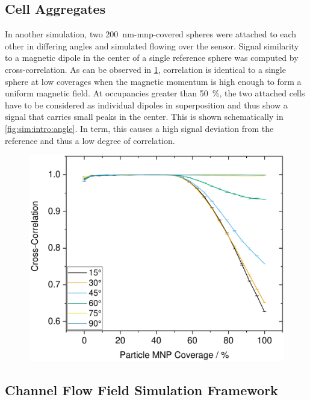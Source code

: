 \subsection{Cell Aggregates}
In another simulation, two \SI{200}{\nano\meter}-\gls{mnp}-covered spheres were attached to each other in differing angles and simulated flowing over the sensor. Signal similarity to a magnetic dipole in the center of a single reference sphere was computed by cross-correlation. As can be observed in \cref{fig:sim:aggregates}, correlation is identical to a single sphere at low coverages when the magnetic momentum is high enough to form a uniform magnetic field. At occupancies greater than \SI{50}{\percent}, the two attached cells have to be considered as individual dipoles in superposition and thus show a signal that carries small peaks in the center. This is shown schematically in \cref{fig:sim:intro:angle}. In term, this causes a high signal deviation from the reference and thus a low degree of correlation.
\begin{figure}
	\centering
	\includegraphics[width=.7\linewidth]{Ressources/Simulation/Aggregates}	
	\label{fig:sim:aggregates}
\end{figure}

\subsection{Channel Flow Field Simulation Framework}

